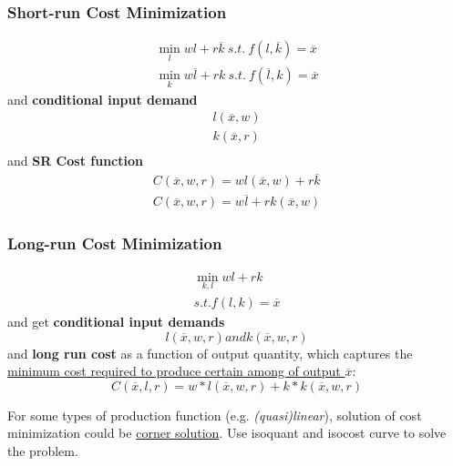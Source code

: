 \documentclass[]{article}
\begin{document}
            \subsubsection{Short-run Cost Minimization}
                \begin{gather*}
                    \min_{l} wl + r\overline{k}\ s.t.\ f(l, \overline{k}) = \overline{x} \\
                    \min_{k} w\overline{l} + rk\ s.t.\ f(\overline{l}, k) = \overline{x}
                \end{gather*}
                and \textbf{conditional input demand}
                \begin{gather*}
                    l(\overline{x}, w) \\
                    k(\overline{x}, r) \\
                \end{gather*}
                and \textbf{SR Cost function}
                \begin{gather*}
                    C(\overline{x}, w, r) = wl(\overline{x}, w) + r \overline{k} \\
                    C(\overline{x}, w, r) = w\overline{l} + r k(\overline{x}, w)
                \end{gather*}
                
            \subsubsection{Long-run Cost Minimization}
                \begin{gather*}
                    \min_{k, l} wl + rk \\
                    s.t. f(l, k) = \overline{x}
                \end{gather*}
                and get \textbf{conditional input demands}
                \[
                    l(\overline{x}, w, r) and k(\overline{x}, w, r)
                \]
                and \textbf{long run cost} as a function of output quantity, which captures the \ul{minimum cost required to produce certain among of output $\overline{x}$}:
                \[
                    C(\overline{x}, l, r) = w*l(\overline{x}, w, r) + k*k(\overline{x}, w, r)
                \]
                
                \begin{remark}
                    For some types of production function (e.g. \emph{(quasi)linear}), solution of cost minimization could be \ul{corner solution}. Use isoquant and isocost curve to solve the problem.
                \end{remark}
                
\end{document}
